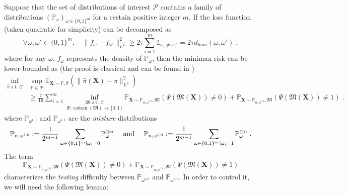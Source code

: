 \documentclass[10pt]{article} %
\def\Ind{\mathds{1}}
\newcommand{\Prob}[0]{\mathbb{P}}
\newcommand{\E}[0]{\mathbb{E}}
\newcommand{\eqdef}{\vcentcolon=}
\newcommand\mech[1]{\mathfrak{#1}}
\newcommand\vect[1]{\mathbf{#1}}
\newcommand\codom[1]{\operatorname{codom}\left({#1}\right)}
\newcommand\ham[2]{d_\mathrm{ham}\left( {#1}, {#2} \right)}
\newcommand\p[1]{\left( {#1}\right)}
\begin{document}
Suppose that the set of distributions of interest $\mathcal{P}$ contains a family of distributions $(\Prob_\omega)_{\omega \in \{0, 1 \}^m}$ for a certain positive integer $m$. If the loss function (taken quadratic for simplicity) can be decomposed as 
\begin{equation}
\label{eq:Assouadcondition}
    \forall \omega, \omega' \in \{0, 1 \}^m, \quad \| f_\omega - f_{\omega '} \|_{L^2}^2
    \geq 
    2 \tau \sum_{i=1}^m \Ind_{\omega_{i} \neq \omega_{i}'} = 2 \tau\ham{\omega}{\omega'}\;,
\end{equation}
where for any $\omega$, $f_\omega$ represents the density of $\Prob_\omega$,
then the minimax risk can be lower-bounded as (the proof is classical and can be found in \citet[Section 5.4]{acharya2021differentially})
\begin{equation}
\label{eq:Assouadprivate}
\begin{aligned}
    \inf_{\hat{\pi} \text{ s.t. } \mathcal{C}} &\sup_{\Prob \in \mathcal{P}}  \E_{\vect{X} \sim \Prob, \hat{\pi}} (\|\hat{\pi}(\vect{X}) - \pi \|_{L^2}^2) \\
    &\geq 
    \frac{\tau}{16} \sum_{i=1}^m \underset{\Psi : \codom{\mech{M}} \rightarrow \{0, 1\}}{\inf_{\mech{M} \text{ s.t. } \mathcal{C}}} \Prob_{\mathbf{X} \sim \Prob_{n, \omega^{i, 0}}, \mech{M}} \p{ \Psi \p{\mech{M}(\vect{X})} \neq 0} + \Prob_{\mathbf{X} \sim \Prob_{n, \omega^{i, 1}}, \mech{M}} \p{ \Psi \p{\mech{M}(\vect{X})} \neq 1} \;.
\end{aligned}
\end{equation}
where $\Prob_{\omega^{i, 0}}$ and $\Prob_{\omega^{i, 1}}$ are the \emph{mixture} distributions
\begin{equation}\label{eq:AssouadMixtures}
    \Prob_{n, \omega^{i, 0}} \eqdef \frac{1}{2^{m-1}} \sum_{\omega \in \{0, 1 \}^m | \omega_i = 0} \Prob_\omega^{\otimes n}
    \quad \text{ and }
    \quad 
    \Prob_{n, \omega^{i, 0}} \eqdef \frac{1}{2^{m-1}} \sum_{\omega \in \{0, 1 \}^m | \omega_i = 1} \Prob_\omega^{\otimes n}  \;.
\end{equation}
The term 
\begin{equation*}
    \Prob_{\mathbf{X} \sim \Prob_{n, \omega^{i, 0}}, \mech{M}} \p{ \Psi \p{\mech{M}(\vect{X})} \neq 0} + \Prob_{\mathbf{X} \sim \Prob_{n, \omega
    ^{i, 1}}, \mech{M}} \p{ \Psi \p{\mech{M}(\vect{X})} \neq 1}
\end{equation*}
characterizes the \emph{testing} difficulty between $\Prob_{\omega^{i, 0}}$ and $\Prob_{\omega^{i, 1}}$. 
In order to control it, we will need the following lemma:
\end{document}
